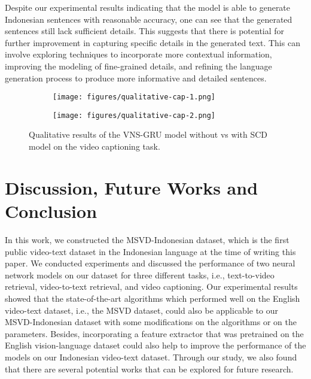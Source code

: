 \documentclass{article}
\begin{document}
Despite our experimental results indicating that the model is able to generate Indonesian sentences with reasonable accuracy, one can see that the generated sentences still lack sufficient details. This suggests that there is potential for further improvement in capturing specific details in the generated text. This can involve exploring techniques to incorporate more contextual information, improving the modeling of fine-grained details, and refining the language generation process to produce more informative and detailed sentences.




\begin{figure}[htbp]
  \centering
  \begin{subfigure}[b]{0.495\textwidth}
    \centering
    \texttt{[image: figures/qualitative-cap-1.png]}
    \caption{}
    \label{fig:cap1}
  \end{subfigure}
  \hfill
  \begin{subfigure}[b]{0.495\textwidth}
    \centering
    \texttt{[image: figures/qualitative-cap-2.png]}
    \caption{}
    \label{fig:cap2}
  \end{subfigure}
  
  \caption{Qualitative results of the VNS-GRU model without vs with SCD model on the video captioning task.}
  \label{fig:qual-cap}
\end{figure}



\section{Discussion, Future Works and Conclusion}
\label{sec:future}
In this work, we constructed the MSVD-Indonesian dataset, which is the first public video-text dataset in the Indonesian language at the time of writing this paper. We conducted experiments and discussed the performance of two neural network models on our dataset for three different tasks, i.e., text-to-video retrieval, video-to-text retrieval, and video captioning. Our experimental results showed that the state-of-the-art algorithms which performed well on the English video-text dataset, i.e., the MSVD dataset, could also be applicable to our MSVD-Indonesian dataset with some modifications on the algorithms or on the parameters. Besides, incorporating a feature extractor that was pretrained on the English vision-language dataset could also help to improve the performance of the models on our Indonesian video-text dataset. Through our study, we also found that there are several potential works that can be explored for future research.
\end{document}
